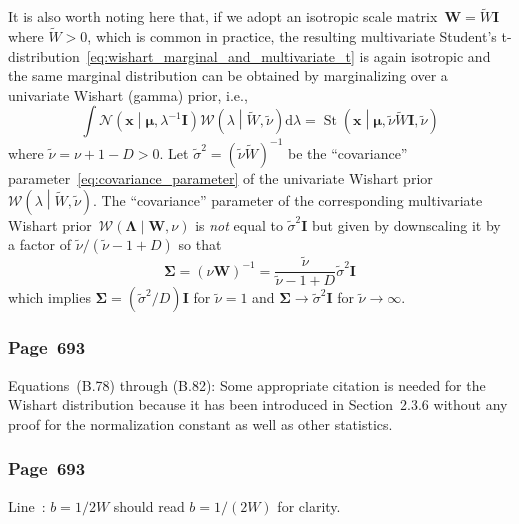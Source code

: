 \documentclass[12pt,a4paper]{article}
\newcommand{\erratum}[1]{\subsubsection*{#1}}
\begin{document}
It is also worth noting here that,
if we adopt an isotropic scale matrix~$\mathbf{W} = \widetilde{W}\mathbf{I}$ where
$\widetilde{W} > 0$,
which is common in practice,
the resulting multivariate Student's t-distribution~\eqref{eq:wishart_marginal_and_multivariate_t}
is again isotropic and the same marginal distribution can be obtained by marginalizing over
a univariate Wishart (gamma) prior, i.e.,
\begin{equation}
\int \mathcal{N}\left(\mathbf{x}\middle|\bm{\mu}, \lambda^{-1}\mathbf{I}\right)
\mathcal{W}\left(\lambda\middle|\widetilde{W}, \widetilde{\nu}\right) \mathrm{d}\lambda
= \operatorname{St}\left(\mathbf{x} \middle|
\bm{\mu}, \widetilde{\nu} \widetilde{W} \mathbf{I}, \widetilde{\nu} \right)
\end{equation}
where $\widetilde{\nu} = \nu + 1 - D > 0$.
Let $\widetilde{\sigma}^{2} = \left(\widetilde{\nu}\widetilde{W}\right)^{-1}$ be
the ``covariance'' parameter~\eqref{eq:covariance_parameter} of the univariate Wishart
prior~$\mathcal{W}\left(\lambda\middle|\widetilde{W}, \widetilde{\nu}\right)$.
The ``covariance'' parameter of the corresponding multivariate Wishart
prior~$\mathcal{W}\left(\bm{\Lambda}\middle|\mathbf{W}, \nu\right)$ is \emph{not} equal to
$\widetilde{\sigma}^{2} \mathbf{I}$ but given by downscaling it by a factor of
$\widetilde{\nu}/(\widetilde{\nu} - 1 + D)$ so that
\begin{equation}
\bm{\Sigma} = \left(\nu\mathbf{W}\right)^{-1} =
\frac{\widetilde{\nu}}{\widetilde{\nu} - 1 + D} \widetilde{\sigma}^{2} \mathbf{I}
\end{equation}
which implies
$\bm{\Sigma} = \left(\widetilde{\sigma}^{2} / D\right)\mathbf{I}$ for $\widetilde{\nu} = 1$ and
$\bm{\Sigma} \to \widetilde{\sigma}^{2}\mathbf{I}$ for $\widetilde{\nu} \to \infty$.

\erratum{Page~693}
Equations~(B.78) through (B.82):
Some appropriate citation is needed for the Wishart distribution
because it has been introduced in Section~2.3.6 without any proof for
the normalization constant as well as other statistics.

\erratum{Page~693}
Line~: $b = 1/2W$ should read $b = 1/(2W)$ for clarity.
\end{document}

